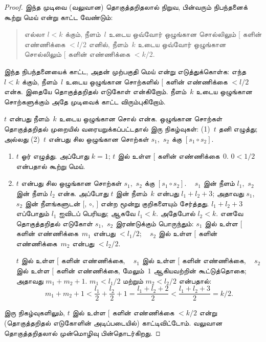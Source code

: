 \documentclass[../../../include/open-logic-section]{subfiles}
\begin{document}
\begin{proof}
இந்த முடிவை (வலுவான) தொகுத்தறிதலால் நிறுவ,
பின்வரும் நிபந்தனைக் கூற்று மெய் என்று காட்ட வேண்டும்:
\begin{quote}
  எல்லா $l < k$ க்கும், நீளம்~$l$ உடைய
  ஒவ்வோர் ஒழுங்கான சொல்லிலும் $[$ களின்
  எண்ணிக்கை $< l/2$ எனில், நீளம்~$k$
  உடைய ஒவ்வோர் ஒழுங்கான சொல்லிலும் $[$ களின்
  எண்ணிக்கை $< k/2$.
\end{quote}
இந்த நிபந்தனையைக் காட்ட, அதன் முற்பகுதி மெய்
என்று எடுத்துக்கொள்க: எந்த $l<k$ க்கும்,
நீளம்~$l$ உடைய ஒழுங்கான சொற்களில்
$[$ களின் எண்ணிக்கை $< l/2$ என்க.
இதையே தொகுத்தறிதல் எடுகோள் என்கிறோம்.
நீளம்~$k$ உடைய ஒழுங்கான சொற்களுக்கும்
அதே முடிவைக் காட்ட விரும்புகிறோம்.

$t$ என்பது நீளம்~$k$ உடைய ஒழுங்கான
சொல் என்க. ஒழுங்கான சொற்கள் தொகுத்தறிதல்
முறையில் வரையறுக்கப்பட்டதால் இரு நிகழ்வுகள்:
(1)~$t$ தனி எழுத்து; அல்லது (2)~$t$
என்பது சில ஒழுங்கான சொற்கள் $s_1$,~$s_2$
க்கு $[s_1 \circ s_2]$.
\begin{enumerate}
\item $t$ ஓர் எழுத்து. அப்போது $k = 1$;
  $t$ இல் உள்ள $[$ களின் எண்ணிக்கை~$0$.
  $0 < 1/2$ என்பதால் கூற்று மெய்.
\item $t$ என்பது சில ஒழுங்கான சொற்கள்
  $s_1$,~$s_2$ க்கு $[s_1 \circ s_2]$.
  ~ $s_1$ இன் நீளம் $l_1$,~$s_2$ இன்
  நீளம் $l_2$ என்க. அப்போது $t$ இன்
  நீளம்~$k$ என்பது $l_1+l_2+3$; அதாவது
  $s_1$, $s_2$ இன் நீளங்களுடன் $[$,
  $\circ$, $]$ என்ற மூன்று குறிகளையும்
  சேர்த்தது. $l_1+l_2+3$ எப்போதும்
  $l_1$ ஐவிடப் பெரியது; ஆகவே $l_1 < k$.
  அதேபோல் $l_2 < k$. எனவே தொகுத்தறிதல்
  எடுகோள் $s_1$,~$s_2$ இரண்டுக்கும்
  பொருந்தும்: $s_1$ இல் உள்ள $[$ களின்
  எண்ணிக்கை~$m_1$ என்பது $< l_1/2$;
  ~ $s_2$ இல் உள்ள $[$ களின்
  எண்ணிக்கை~$m_2$ என்பது $< l_2/2$.

  $t$ இல் உள்ள $[$ களின் எண்ணிக்கை,
  ~ $s_1$ இல் உள்ள $[$ களின் எண்ணிக்கை,
  ~ $s_2$ இல் உள்ள $[$ களின் எண்ணிக்கை,
  மேலும்~$1$ ஆகியவற்றின் கூட்டுத்தொகை;
  அதாவது $m_1 + m_2 + 1$. $m_1
  < l_1/2$ மற்றும் $m_2 < l_2/2$
  என்பதால்:
  \[
  m_1 + m_2 + 1 < \frac{l_1}{2} + \frac{l_2}{2} + 1 = \frac{l_1+l_2+2}{2} < \frac{l_1+l_2+3}{2} = k/2.
  \]
\end{enumerate}
இரு நிகழ்வுகளிலும், $t$ இல் உள்ள
$[$ களின் எண்ணிக்கை $< k/2$ என்று
(தொகுத்தறிதல் எடுகோளின் அடிப்படையில்)
காட்டிவிட்டோம். வலுவான தொகுத்தறிதலால்
முன்மொழிவு பின்தொடர்கிறது.
\end{proof}
\end{document}
